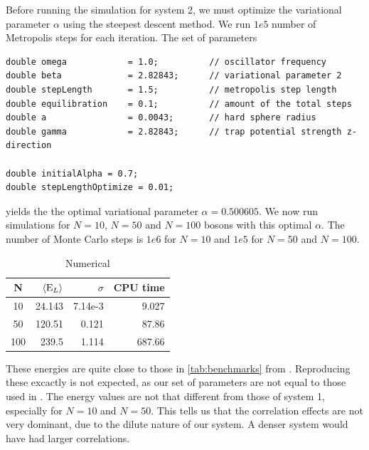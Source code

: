 \documentclass[english, a4paper]{article}
\begin{document}
Before running the simulation for system 2, we must optimize the variational parameter $\alpha$ using
the steepest descent method. We run $1e5$ number of Metropolis steps for each iteration.
The set of parameters
\belowcaptionskip=-10pt
\begin{lstlisting}[label=parameters3,caption=Parameters system 2]
double omega            = 1.0;          // oscillator frequency
double beta             = 2.82843;      // variational parameter 2
double stepLength       = 1.5;          // metropolis step length
double equilibration    = 0.1;          // amount of the total steps
double a                = 0.0043;       // hard sphere radius
double gamma            = 2.82843;      // trap potential strength z-direction

double initialAlpha = 0.7;
double stepLengthOptimize = 0.01;
\end{lstlisting}
yields the the optimal variational parameter $\alpha = 0.500605$. 
We now run simulations for $N=10$, $N=50$ and $N=100$ bosons with this optimal $\alpha$. 
The number of Monte Carlo steps is $1e6$ for $N=10$ and $1e5$ for $N=50$ and $N=100$.
\begin{table}[H]
  \centering
  \begin{tabular}{ | c | r | r | r | }
    \hline
    N& $\langle {\textrm E_L}\rangle$& $\sigma$& CPU time \\*
    \hline
    10& 24.143& 7.14e-3& 9.027 \\*
    \hline
    50& 120.51& 0.121& 87.86  \\*
    \hline
    100& 239.5& 1.114& 687.66\\*
    \hline
  \end{tabular}
  \caption{Numerical}
  \label{tab:Tabell1}
\end{table}
These energies are quite close to those in \ref{tab:benchmarks} from \cite{ref1}. 
Reproducing these excactly is not expected, as our set of parameters are not equal to those used in \cite{ref1}. 
The energy values are not that different from those of system 1, especially for $N=10$ and $N=50$. 
This tells us that the correlation effects are not very dominant, due to the dilute nature of our system. 
A denser system would have had larger correlations. 
\end{document}
